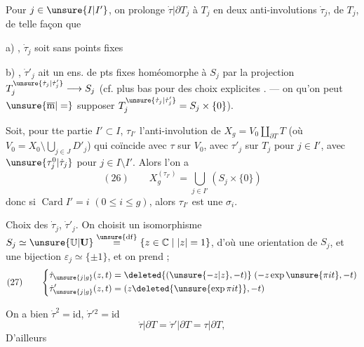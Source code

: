 Pour  $j\in\unsure{I|I'}$, on prolonge $\dot\tau|\partial T_j$ à $T_j$ en deux anti-involutions $\dot\tau_j$,  de $T_j$,   de telle façon que


a) , $\dot\tau_j$ soit sans points fixes

b) , $\dot\tau'_j$ ait un ens. de pts fixes homéomorphe à $S_j$ par la projection $T_j^{\unsure{\dot\tau_j|\dot\tau'_j}}\longrightarrow S_j$ (cf. plus bas \unsure{\}} pour des choix   explicites \unsure{\}}. --- on  qu'on peut $\unsure{\overline{\mathrm m}|=}$ supposer $T_j^{\unsure{\dot\tau_j|\dot\tau'_j}}=S_j\times\{0\}$).

Soit, pour tte partie $I'\subset I$, $\tau_{I'}$ l'anti-involution de $X_g=V_0\amalg_{\partial T}T$ (où $V_0=X_0\setminus\bigcup_{j\in J}D'_j$) qui coïncide avec $\tau$ sur $V_0$, avec $\tau'_j$ sur $T_j$ pour $j\in I'$, avec $\unsure{\tau_j^0|\dot\tau_j}$ pour $j\in I\setminus I'$. Alors l'on a
\[
(26)\qquad X_g^{(\tau_{I'})}=\bigcup_{j\in I'}(S_j\times\{0\})
\]
donc si $\operatorname{Card}I'=i$ $(0\leq i\leq g)$, alors $\tau_{I'}$ est une $\sigma_i$.

Choix des $\dot\tau_j$, $\dot\tau'_j$. On choisit un isomorphisme $S_j\simeq\unsure{\mathbb U|\mathbf U}\overset{\unsure{\mathrm{df}}}{=}\{z\in\mathbb C\mid |z|=1\}$, d'où une orientation de $S_j$, et une bijection $\varepsilon_j\simeq\{\pm1\}$,  et on prend ;
\[
(27)\qquad
\left\{\begin{aligned}
\dot\tau_{\unsure{j|g}}(z,t)&=\deleted{(\unsure{-z|z},-t)}\;(-z\exp\unsure{\pi it},-t)\\
\dot\tau'_{\unsure{j|g}}(z,t)&=(z\deleted{\unsure{\exp\pi it}},-t)
\end{aligned}\right.
\]


 On a bien $\dot\tau^2=\mathrm{id}$, $\dot\tau'{}^2=\mathrm{id}$
\[
\dot\tau|\partial T=\dot\tau'|\partial T=\tau|\partial T,
\]
D'ailleurs


